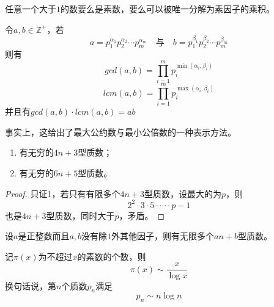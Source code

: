 \begin{theorem}
	任意一个大于$1$的数要么是素数，要么可以被唯一分解为素因子的乘积。
\end{theorem}
\begin{theorem}
	令$a,b\in \mathbb{Z}^+$，若
	\begin{equation*}
		a = p_1^{\alpha_1}p_2^{\alpha_2}\cdots p_m^{\alpha_m}\quad\text{与}\quad
		b = p_1^{\beta_1}p_2^{\beta_2}\cdots p_m^{\beta_m}
	\end{equation*}
	则有
	\begin{equation*}
		gcd(a, b) = \prod\limits_{i=1}^mp_i^{\min (\alpha_i,\beta_i)}
	\end{equation*}
	\begin{equation*}
		lcm(a, b) = \prod\limits_{i=1}^mp_i^{\max (\alpha_i,\beta_i)}
	\end{equation*}
	并且有$gcd(a,b)\cdot lcm(a, b) = ab$
\end{theorem}
\begin{note}
	事实上，这给出了最大公约数与最小公倍数的一种表示方法。
\end{note}
\begin{theorem}
	\begin{enumerate}
		\item 有无穷的$4n+3$型质数；
		\item 有无穷的$6n+5$型质数。
	\end{enumerate}
\end{theorem}
\begin{proof}
	只证1，若只有有限多个$4n+3$型质数，设最大的为$p$，则
	\begin{equation*}
		2^2\cdot 3 \cdot 5 \cdot \cdots \cdot p - 1
	\end{equation*}
	也是$4n+3$型质数，同时大于$p$，矛盾。
\end{proof}
\begin{theorem}[Dirichlet定理]
	设$a$是正整数而且$a,b$没有除$1$外其他因子，则有无限多个$an+b$型质数。
\end{theorem}
\begin{theorem}[素数定理]
	记$\pi(x)$为不超过$x$的素数的个数，则
	\begin{equation*}
		\pi(x)\sim \frac{x}{\log x}
	\end{equation*}
	换句话说，第$n$个质数$p_n$满足
	\begin{equation*}
		p_n\sim n\log n
	\end{equation*}
\end{theorem}
